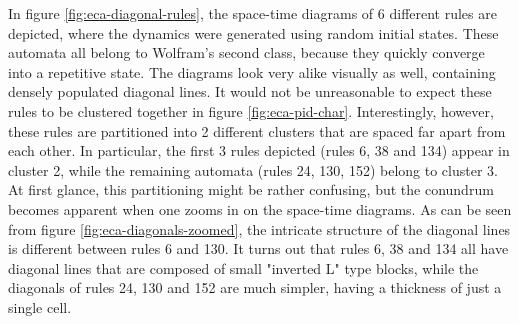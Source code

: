 \documentclass[12pt]{article}
\begin{document}
In figure \ref{fig:eca-diagonal-rules}, the space-time diagrams of 6 different rules are depicted, where the dynamics were generated using random initial states. These automata all belong to Wolfram's second class, because they quickly converge into a repetitive state. The diagrams look very alike visually as well, containing densely populated diagonal lines. It would not be unreasonable to expect these rules to be clustered together in figure \ref{fig:eca-pid-char}. Interestingly, however, these rules are partitioned into 2 different clusters that are spaced far apart from each other. In particular, the first 3 rules depicted (rules 6, 38 and 134) appear in cluster 2, while the remaining automata (rules 24, 130, 152) belong to cluster 3. At first glance, this partitioning might be rather confusing, but the conundrum becomes apparent when one zooms in on the space-time diagrams. As can be seen from figure  \ref{fig:eca-diagonals-zoomed}, the intricate structure of the diagonal lines is different between rules 6 and 130. It turns out that rules 6, 38 and 134 all have diagonal lines that are composed of small "inverted L" type blocks, while the diagonals of rules 24, 130 and 152 are much simpler, having a thickness of just a single cell. 
\end{document}
